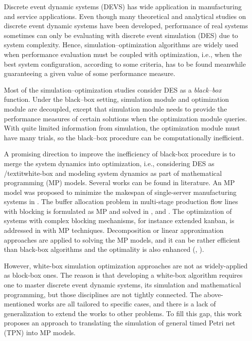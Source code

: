 \documentclass[suppldata]{interact}
\theoremstyle{plain}
\theoremstyle{definition}
\theoremstyle{remark}
\begin{document}
Discrete event dynamic systems (DEVS) has wide application in manufacturing and service applications. Even though many theoretical and analytical studies on discrete event dynamic systems have been developed, performance of real systems sometimes can only be evaluating with discrete event simulation (DES) due to system complexity. Hence, simulation--optimization algorithms are widely used when performance evaluation must be coupled with optimization, i.e., when the best system configuration, according to some criteria, has to be found meanwhile guaranteeing a given value of some performance measure.  


Most of the simulation--optimization studies consider DES as a \textit{black--box} function. Under the black--box setting, simulation module and optimization module are decoupled, except that simulation module needs to provide the performance measures of certain solutions when the optimization module queries. With quite limited information from simulation, the optimization module must have many trials, so the black--box procedure can be computationally inefficient.


A promising direction to improve the inefficiency of black-box procedure is to merge the system dynamics into optimization, i.e., considering DES as /textit{white-box} and modeling system dynamics as part of mathematical programming (MP) models. Several works can be found in literature. An MP model was proposed to minimize the makespan of single-server manufacturing systems in \cite{di2020makespan}. The buffer allocation problem in multi-stage production flow lines with blocking is formulated as MP and solved in \cite{matta2008simulation}, \cite{weiss2015buffer} and \cite{alfieri2020time}. The optimization of systems with complex blocking mechanisms, for instance extended kanban, is addressed in \cite{pedrielli2015integrated} with MP techniques. Decomposition or linear approximation approaches are applied to solving the MP models, and it can be rather efficient than black-box algorithms and the optimality is also enhanced (\cite{weiss2015buffer}, \cite{alfieri2020time}). 


However, white-box simulation optimization approaches are not as widely-applied as block-box ones. The reason is that developing a white-box algorithm requires one to master discrete event dynamic systems, its simulation and mathematical programming, but those disciplines are not tightly connected. The above-mentioned works are all tailored to specific cases, and there is a lack of generalization to extend the works to other problems. To fill this gap, this work proposes an approach to translating the simulation of general timed Petri net (TPN) into MP models.
\end{document}
